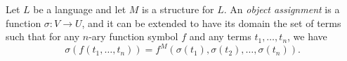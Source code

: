 \begin{definition}
  Let $L$ be a language and let $M$ is a structure for $L$.
  An \emph{object assignment} is a function $\sigma: V \to U$, and it can be
  extended to have its domain the set of terms such that for any
  $n$-ary function symbol $f$ and any terms $t_1, \dots, t_n$, we have
  \begin{equation*}
    \sigma(f(t_1, \dots, t_n))
    = f^M(\sigma(t_1), \sigma(t_2), \dots, \sigma(t_n)).
  \end{equation*}
\end{definition}